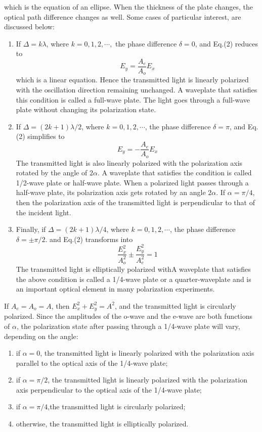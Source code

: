 \documentclass{article}
\begin{document}
which is the equation of an ellipse.
When the thickness of the plate changes, the optical path difference changes as well. Some cases of particular interest, are discussed below:
\begin{enumerate}[$\blacktriangleright$]
	\item If $ \Delta=k\lambda $, where $ k=0,1,2,\cdots, $ the phase difference $ \delta=0 $, and Eq.(2) reduces to 
	$$ E_y=\dfrac{A_e}{A_o}E_x $$
	which is a linear equation. Hence the transmitted light is linearly polarized with the oscillation direction remaining unchanged. A waveplate that satisfies this condition is called a full-wave plate. The light goes through a full-wave plate without changing its polarization state.
	\item If $ \Delta=(2k+1)\lambda/2 $, where $ k=0,1,2,\cdots $, the phase difference $ \delta=\pi $, and Eq. (2) simplifies to 
	$$ E_y=-\dfrac{A_e}{A_o}E_x $$
	The transmitted light is also linearly polarized with the polarization axis rotated by the angle of $ 2\alpha $. A waveplate that satisfies the condition is called 1/2-wave plate or half-wave plate. When a polarized light passes through a half-wave plate, its polarization axis gets rotated by an angle $ 2\alpha $. If $ \alpha=\pi/4 $, then the polarization axis of the transmitted light is perpendicular to that of the incident light.
	\item Finally, if $ \Delta=(2k+1)\lambda/4 $, where $ k=0,1,2,\cdots $, the phase difference $ \delta=\pm\pi/2 $. and Eq.(2) transforms into
	$$  \dfrac{E_x^2}{A_o^2}\pm\dfrac{E_y^2}{A_e^2}=1 $$
	The transmitted light is elliptically polarized withA waveplate that satisfies the above condition is called a 1/4-wave plate or a quarter-waveplate and is an important optical element in many polarization experiments.
\end{enumerate}
If $ A_e = A_o = A $, then $ E^2_x + E^2_y = A^2 $, and the transmitted light is circularly polarized. Since the amplitudes of the o-wave and the e-wave are both functions of $ \alpha $, the polarization state after passing through a 1/4-wave plate will vary, depending on the angle:
\begin{enumerate}[$\blacktriangleright$]
	\item if $ \alpha= 0 $, the transmitted light is linearly polarized with the polarization axis parallel to the optical axis of the 1/4-wave plate;
	\item if $ \alpha=\pi/2 $, the transmitted light is linearly polarized with the polarization axis perpendicular to the optical axis of the 1/4-wave plate;
	\item if $ \alpha=\pi/4 $,the transmitted light is circularly polarized;
	\item otherwise, the transmitted light is elliptically polarized.
\end{enumerate}
\end{document}
